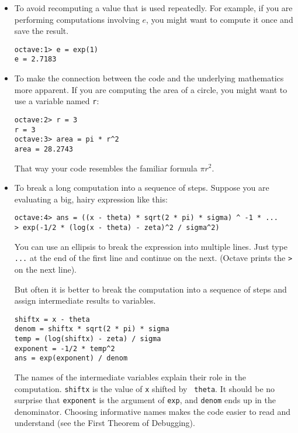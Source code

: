 \begin{itemize}

\item To avoid recomputing a value that is used repeatedly. For
example, if you are performing computations involving $e$, you might
want to compute it once and save the result.

\begin{verbatim}
octave:1> e = exp(1)
e = 2.7183
\end{verbatim}


\item To make the connection between the code and the underlying
mathematics more apparent. If you are computing the area of a circle,
you might want to use a variable named {\tt r}:

\begin{verbatim}
octave:2> r = 3
r = 3
octave:3> area = pi * r^2
area = 28.2743
\end{verbatim}

That way your code resembles the familiar formula $\pi r^2$.

\item To break a long computation into a sequence of steps.
Suppose you are evaluating a big, hairy expression like this:

\begin{verbatim}
octave:4> ans = ((x - theta) * sqrt(2 * pi) * sigma) ^ -1 * ...
> exp(-1/2 * (log(x - theta) - zeta)^2 / sigma^2)
\end{verbatim}

You can use an ellipsis to break the expression into multiple lines.
Just type {\tt ...} at the end of the first line and
continue on the next. (Octave prints the {\tt >} on the next line).

But often it is better to break the computation into a sequence of
steps and assign intermediate results to variables.

\begin{verbatim}
shiftx = x - theta
denom = shiftx * sqrt(2 * pi) * sigma
temp = (log(shiftx) - zeta) / sigma
exponent = -1/2 * temp^2
ans = exp(exponent) / denom
\end{verbatim}

The names of the intermediate variables explain their role in the
computation. {\tt shiftx} is the value of {\tt x} shifted by {\tt
theta}. It should be no surprise that {\tt exponent} is the argument
of {\tt exp}, and {\tt denom} ends up in the denominator. Choosing
informative names makes the code easier to read and understand (see
the First Theorem of Debugging).

\end{itemize}


